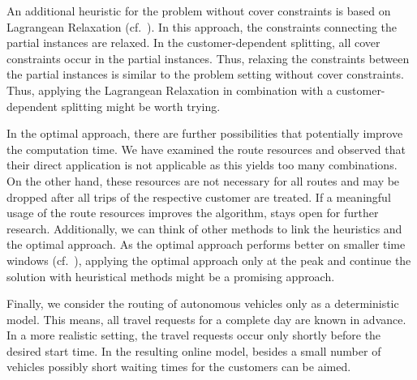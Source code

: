 An additional heuristic for the problem without cover constraints is based on Lagrangean Relaxation (cf.~\cite[Chapter~9]{Knoll}). In this approach, the constraints connecting the partial instances are relaxed. In the customer-dependent splitting, all cover constraints occur in the partial instances. Thus, relaxing the constraints between the partial instances is similar to the problem setting without cover constraints. Thus, applying the Lagrangean Relaxation in combination with a customer-dependent splitting might be worth trying.

In the optimal approach, there are further possibilities that potentially improve the computation time. We have examined the route resources and observed that their direct application is not applicable as this yields too many combinations. On the other hand, these resources are not necessary for all routes and may be dropped after all trips of the respective customer are treated. If a meaningful usage of the route resources improves the algorithm, stays open for further research. Additionally, we can think of other methods to link the heuristics and the optimal approach. As the optimal approach performs better on smaller time windows (cf.~\cite[Sec.~10.2]{Kaiser}), applying the optimal approach only at the peak and continue the solution with heuristical methods might be a promising approach.

Finally, we consider the routing of autonomous vehicles only as a deterministic model. This means, all travel requests for a complete day are known in advance. In a more realistic setting, the travel requests occur only shortly before the desired start time. In the resulting online model, besides a small number of vehicles possibly short waiting times for the customers can be aimed.